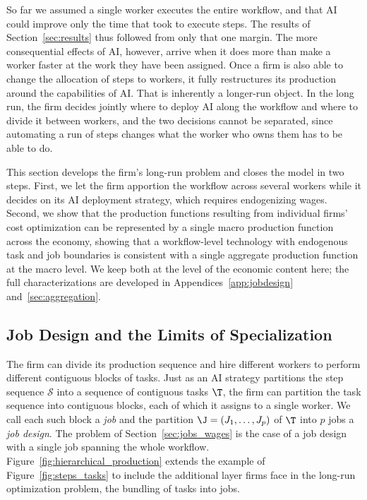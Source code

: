 So far we assumed a single worker executes the entire workflow, and that AI could improve only the time that took to execute steps. 
The results of Section~\ref{sec:results} thus followed from only that one margin.
The more consequential effects of AI, however, arrive when it does more than make a worker faster at the work they have been assigned.
Once a firm is also able to change the allocation of steps to workers, it fully restructures its production around the capabilities of AI.
That is inherently a longer-run object. 
In the long run, the firm decides jointly where to deploy AI along the workflow and where to divide it between workers, and the two decisions cannot be separated, since automating a run of steps changes what the worker who owns them has to be able to do.

This section develops the firm's long-run problem and closes the model in two steps.
First, we let the firm apportion the workflow across several workers while it decides on its AI deployment strategy, which requires endogenizing wages.
Second, we show that the production functions resulting from individual firms' cost optimization can be represented by a single macro production function across the economy, showing that a workflow-level technology with endogenous task and job boundaries is consistent with a single aggregate production function at the macro level.
We keep both at the level of the economic content here; the full characterizations are developed in Appendices~\ref{app:jobdesign} and~\ref{sec:aggregation}.


\subsection{Job Design and the Limits of Specialization}
\label{sec:longrun.jobdesign}

The firm can divide its production sequence and hire different workers to perform different contiguous blocks of tasks.
Just as an AI strategy partitions the step sequence $\mathcal{S}$ into a sequence of contiguous tasks $\T$, the firm can partition the task sequence into contiguous blocks, each of which it assigns to a single worker.
We call each such block a \emph{job} and the partition $\J = (J_1, \dotsc, J_p)$ of $\T$ into $p$ jobs a \emph{job design}.
The problem of Section~\ref{sec:jobs_wages} is the case of a job design with a single job spanning the whole workflow.
Figure~\ref{fig:hierarchical_production} extends the example of Figure~\ref{fig:steps_tasks} to include the additional layer firms face in the long-run optimization problem, the bundling of tasks into jobs.

